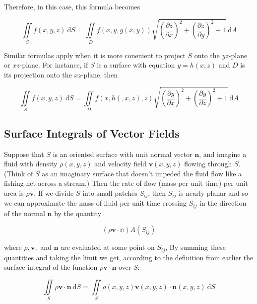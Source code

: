\documentclass{article}
\begin{document}
Therefore, in this case, this formula becomes 

\begin{equation*}
    \iint\limits_{S} f(x,y,z) \ \mathrm{d}S = \iint\limits_{D} f(x,y,g(x,y))\sqrt{(\frac{\partial z}{\partial x})^2 + (\frac{\partial z}{\partial y})^2 + 1} \ \mathrm{d} A
\end{equation*}

Similar formulas apply when it is more conenient to project $S$ onto the $yz$-plane or $xz$-plane. For instance, if $S$ is a surface with equation $y = h(x,z)$ and $D$ is its projection onto the $xz$-plane, then

\begin{equation*}
    \iint\limits_{S} f(x,y,z) \ \mathrm{d}S = \iint\limits_{D} f(x,h(,x,z),z) \sqrt{(\frac{\partial y}{\partial x})^2 + (\frac{\partial y}{\partial z})^2 + 1} \ \mathrm{d}A
\end{equation*}

\subsection{Surface Integrals of Vector Fields}

Suppose that $S$ is an oriented surface with unit normal vector $\mathbf{n}$, and imagine a fluid with density $\rho(x,y,z)$ and velocity field $\mathbf{v}(x,y,z)$ flowing through $S$. (Think of $S$ as an imaginary surface that doesn't impeded the fluid flow like a fishing net across a stream.) Then the rate of flow (mass per unit time) per unit area is $\rho \mathbf{v}$. If we divide $S$ into small patches $S_{ij}$, then $S_{ij}$ is nearly planar and so we can approximate the mass of fluid per unit time crossing $S_{ij}$ in the direction of the normal $\mathbf{n}$ by the quantity

\begin{equation*}
    (\rho \mathbf{v} \cdot \mathbb{n})A(S_{ij})
\end{equation*}

where $\rho, \mathbf{v}, $ and $\mathbf{n}$ are evaluated at some point on $S_{ij}$, By summing these quantities and taking the limit we get, according to the definition from earlier the surface integral of the function $\rho \mathbf{v} \cdot \mathbf{n}$ over $S$:

\begin{equation*}
    \iint\limits_{S} \rho \mathbf{v} \cdot \mathbf{n} \ \mathrm{d}S = \iint\limits_{S} \rho(x,y,z) \mathbf{v}(x,y,z) \cdot \mathbf{n}(x,y,z) \ \mathrm{d}S
\end{equation*}
\end{document}

